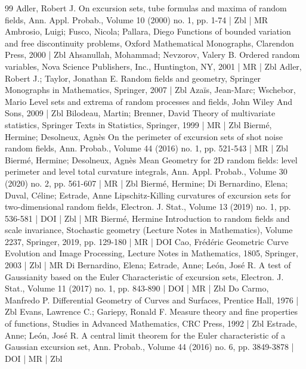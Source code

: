 \documentclass[10pt]{amsart}
\theoremstyle{definition}\newtheorem{defi}[theo]{Definition}\newtheorem{rema}[theo]{Remark}\newtheorem{exam}[theo]{Example}\newtheorem{exem}[theo]{Example}\newtheorem{nota}[theo]{Notation}
\begin{document}
\begin{thebibliography}{99}
Adler, Robert J. On excursion sets, tube formulas and maxima of random fields, Ann. Appl. Probab., Volume 10 (2000) no. 1, pp. 1-74 | Zbl | MR
Ambrosio, Luigi; Fusco, Nicola; Pallara, Diego Functions of bounded variation and free discontinuity problems, Oxford Mathematical Monographs, Clarendon Press, 2000 | Zbl
Ahsanullah, Mohammad; Nevzorov, Valery B. Ordered random variables, Nova Science Publishers, Inc., Huntington, NY, 2001 | MR | Zbl
Adler, Robert J.; Taylor, Jonathan E. Random fields and geometry, Springer Monographs in Mathematics, Springer, 2007 | Zbl
Azaïs, Jean-Marc; Wschebor, Mario Level sets and extrema of random processes and fields, John Wiley And Sons, 2009 | Zbl
Bilodeau, Martin; Brenner, David Theory of multivariate statistics, Springer Texts in Statistics, Springer, 1999 | MR | Zbl
Biermé, Hermine; Desolneux, Agnès On the perimeter of excursion sets of shot noise random fields, Ann. Probab., Volume 44 (2016) no. 1, pp. 521-543 | MR | Zbl
Biermé, Hermine; Desolneux, Agnès Mean Geometry for 2D random fields: level perimeter and level total curvature integrals, Ann. Appl. Probab., Volume 30 (2020) no. 2, pp. 561-607 | MR | Zbl
Biermé, Hermine; Di Bernardino, Elena; Duval, Céline; Estrade, Anne Lipschitz-Killing curvatures of excursion sets for two-dimensional random fields, Electron. J. Stat., Volume 13 (2019) no. 1, pp. 536-581 | DOI | Zbl | MR
Biermé, Hermine Introduction to random fields and scale invariance, Stochastic geometry (Lecture Notes in Mathematics), Volume 2237, Springer, 2019, pp. 129-180 | MR | DOI
Cao, Frédéric Geometric Curve Evolution and Image Processing, Lecture Notes in Mathematics, 1805, Springer, 2003 | Zbl | MR
Di Bernardino, Elena; Estrade, Anne; León, José R. A test of Gaussianity based on the Euler Characteristic of excursion sets, Electron. J. Stat., Volume 11 (2017) no. 1, pp. 843-890 | DOI | MR | Zbl
Do Carmo, Manfredo P. Differential Geometry of Curves and Surfaces, Prentice Hall, 1976 | Zbl
Evans, Lawrence C.; Gariepy, Ronald F. Measure theory and fine properties of functions, Studies in Advanced Mathematics, CRC Press, 1992 | Zbl
Estrade, Anne; León, José R. A central limit theorem for the Euler characteristic of a Gaussian excursion set, Ann. Probab., Volume 44 (2016) no. 6, pp. 3849-3878 | DOI | MR | Zbl

\end{thebibliography}
\end{document}
